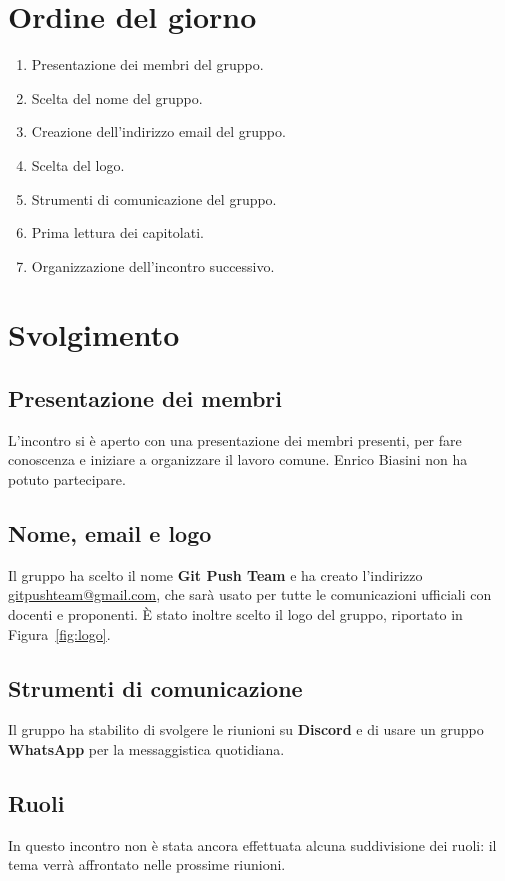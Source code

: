 \documentclass[verbale=interno]{gpt}
\begin{document}
\section{Ordine del giorno}
\begin{enumerate}
  \item Presentazione dei membri del gruppo.
  \item Scelta del nome del gruppo.
  \item Creazione dell'indirizzo email del gruppo.
  \item Scelta del logo.
  \item Strumenti di comunicazione del gruppo.
  \item Prima lettura dei capitolati.
  \item Organizzazione dell'incontro successivo.
\end{enumerate}

\section{Svolgimento}

\subsection{Presentazione dei membri}
L'incontro si è aperto con una presentazione dei membri presenti, per
fare conoscenza e iniziare a organizzare il lavoro comune. Enrico Biasini
non ha potuto partecipare.

\subsection{Nome, email e logo}
Il gruppo ha scelto il nome \textbf{Git Push Team} e ha creato
l'indirizzo \href{mailto:gitpushteam@gmail.com}{gitpushteam@gmail.com},
che sarà usato per tutte le comunicazioni ufficiali con docenti e
proponenti. È stato inoltre scelto il logo del gruppo, riportato in
Figura~\ref{fig:logo}.


\subsection{Strumenti di comunicazione}
Il gruppo ha stabilito di svolgere le riunioni su \textbf{Discord} e di
usare un gruppo \textbf{WhatsApp} per la messaggistica quotidiana.

\subsection{Ruoli}
In questo incontro non è stata ancora effettuata alcuna suddivisione dei
ruoli: il tema verrà affrontato nelle prossime riunioni.
\end{document}
